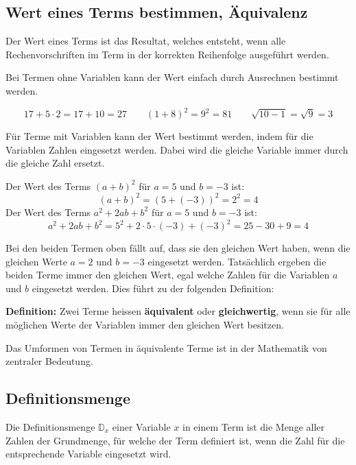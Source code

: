 \subsection{Wert eines Terms bestimmen, Äquivalenz}

Der Wert eines Terms ist das Resultat, welches entsteht, wenn alle Rechenvorschriften im Term in der korrekten Reihenfolge ausgeführt werden.

Bei Termen ohne Variablen kann der Wert einfach durch Ausrechnen bestimmt werden.
\begin{example}
\[
  17 + 5 \cdot 2 = 17 + 10 = 27 \qquad (1 + 8)^{2} = 9^{2} = 81 \qquad \sqrt{10 - 1} = \sqrt{9} = 3
\]
\end{example}

Für Terme mit Variablen kann der Wert bestimmt werden, indem für die Variablen Zahlen eingesetzt werden. Dabei wird die gleiche Variable immer durch die gleiche Zahl ersetzt.
\begin{example}
Der Wert des Terms $(a+b)^{2}$ für $a=5$ und $b=-3$ ist:
\[
  (a+b)^{2} = (5 + (-3))^{2} = 2^{2} = 4
\]
Der Wert des Terms $a^{2} + 2ab+b^{2}$ für $a=5$ und $b=-3$ ist:
\[
  a^{2}+2ab+b^{2} = 5^{2} + 2\cdot 5\cdot(-3) + (-3)^{2} = 25 - 30 + 9 = 4
\]
\end{example}

Bei den beiden Termen oben fällt auf, dass sie den gleichen Wert haben, wenn die gleichen Werte $a=2$ und $b=-3$ eingesetzt werden. Tatsächlich ergeben die beiden Terme immer den gleichen Wert, egal welche Zahlen für die Variablen $a$ und $b$ eingesetzt werden. Dies führt zu der folgenden Definition:

\textbf{Definition:} Zwei Terme heissen \textbf{äquivalent} oder \textbf{gleichwertig}, wenn sie für alle möglichen Werte der Variablen immer den gleichen Wert besitzen.

Das Umformen von Termen in äquivalente Terme ist in der Mathematik von zentraler Bedeutung.

\subsection{Definitionsmenge}

Die Definitionsmenge $\mathbb{D}_{x}$ einer Variable $x$ in einem Term ist die Menge aller Zahlen der Grundmenge, für welche der Term definiert ist, wenn die Zahl für die entsprechende Variable eingesetzt wird.

